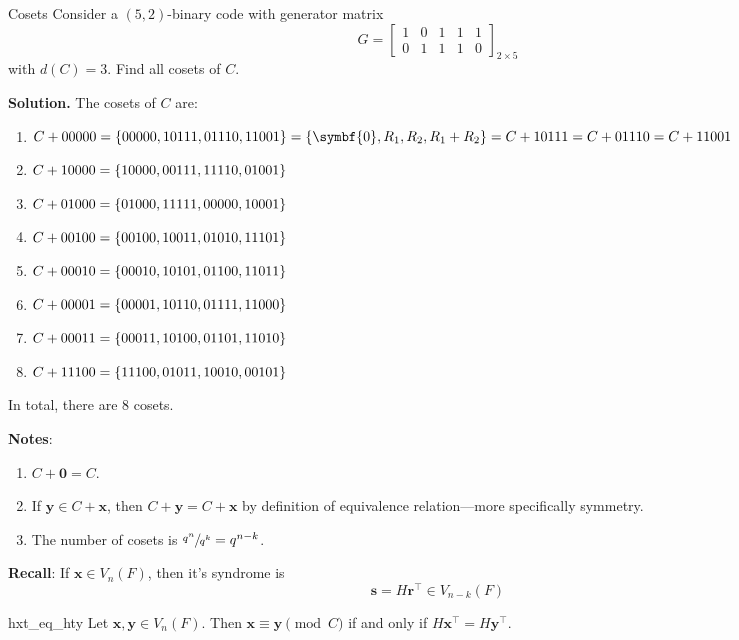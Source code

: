 \begin{Example}{Cosets}{}
    Consider a $ (5,2) $-binary code with generator matrix
    \[ G=\begin{bmatrix}
            1 & 0 & 1 & 1 & 1 \\
            0 & 1 & 1 & 1 & 0
        \end{bmatrix}_{2\times 5} \]
    with $ d(C)=3 $. Find all cosets of $ C $.

    \textbf{Solution.} The cosets of $ C $ are:
    \begin{enumerate}[label=(\arabic*)]
        \item $ C+00000=\set{00000,10111,01110,11001}=\set{\symbf{0},R_1,R_2, R_1+R_2}
                  = C+10111 = C+01110 = C + 11001 $
        \item $ C+10000=\{10000,00111,11110,01001\} $
        \item $ C+01000=\{01000,11111,00000,10001\} $
        \item $ C+00100=\{00100,10011,01010,11101\} $
        \item $ C+00010=\{00010,10101,01100,11011\} $
        \item $ C+00001=\{00001,10110,01111,11000\} $
        \item $ C+00011=\{00011,10100,01101,11010\} $
        \item $ C+11100=\{11100,01011,10010,00101\} $
    \end{enumerate}
    In total, there are $ 8 $ cosets.
\end{Example}

\textbf{Notes}:
\begin{enumerate}[label=(\arabic*)]
    \item $ C+\symbf{0}=C $.
    \item If $ \symbf{y}\in C+\symbf{x} $, then $ C+\symbf{y}=C+\symbf{x} $ by definition
          of equivalence relation---more specifically symmetry.
    \item The number of cosets is $ \sfrac{q^n}{q^k}=q^{n-k} $.
\end{enumerate}

\textbf{Recall}: If $ \symbf{x}\in V_n(F) $, then it's syndrome is
\[ \symbf{s}=H\symbf{r}^\top\in V_{n-k}(F) \]

\begin{Theorem}{}{hxt_eq_hty}
    Let $ \symbf{x},\symbf{y}\in V_n(F) $. Then $ \symbf{x}\equiv \symbf{y}\pmod{C} $
    if and only if $ H\symbf{x}^\top=H\symbf{y}^\top $.
\end{Theorem}

